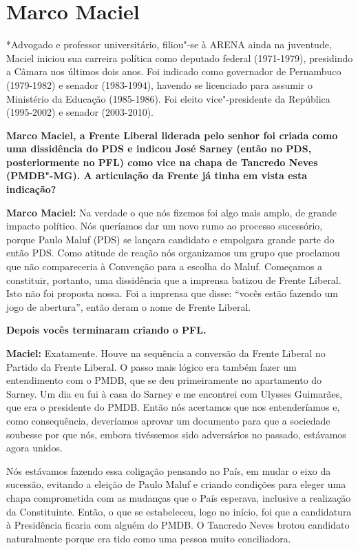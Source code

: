 \section {Marco Maciel}

*Advogado e professor universitário, filiou"-se à ARENA ainda na
juventude, Maciel iniciou sua carreira política como deputado federal
(1971-1979), presidindo a Câmara nos últimos dois anos. Foi indicado
como governador de Pernambuco (1979-1982) e senador (1983-1994), havendo
se licenciado para assumir o Ministério da Educação (1985-1986). Foi
eleito vice"-presidente da República (1995-2002) e senador (2003-2010).

\textbf{Marco Maciel, a Frente Liberal liderada pelo senhor foi criada
como uma dissidência do PDS e indicou José Sarney (então no PDS,
posteriormente no PFL) como vice na chapa de Tancredo Neves (PMDB"-MG). A
articulação da Frente já tinha em vista esta indicação?}

\textbf{Marco Maciel:} Na verdade o que nós fizemos foi algo mais amplo,
de grande impacto político. Nós queríamos dar um novo rumo ao processo
sucessório, porque Paulo Maluf (PDS) se lançara candidato e empolgara
grande parte do então PDS. Como atitude de reação nós organizamos um
grupo que proclamou que não compareceria à Convenção para a escolha do
Maluf. Começamos a constituir, portanto, uma dissidência que a imprensa
batizou de Frente Liberal. Isto não foi proposta nossa. Foi a imprensa
que disse: ``vocês estão fazendo um jogo de abertura'', então deram o
nome de Frente Liberal.

\textbf{Depois vocês terminaram criando o PFL.}

\textbf{Maciel:} Exatamente. Houve na sequência a conversão da Frente
Liberal no Partido da Frente Liberal. O passo mais lógico era também
fazer um entendimento com o PMDB, que se deu primeiramente no
apartamento do Sarney. Um dia eu fui à casa do Sarney e me encontrei com
Ulysses Guimarães, que era o presidente do PMDB. Então nós acertamos que
nos entenderíamos e, como consequência, deveríamos aprovar um documento
para que a sociedade soubesse por que nós, embora tivéssemos sido
adversários no passado, estávamos agora unidos.

Nós estávamos fazendo essa coligação pensando no País, em mudar o eixo
da sucessão, evitando a eleição de Paulo Maluf e criando condições para
eleger uma chapa comprometida com as mudanças que o País esperava,
inclusive a realização da Constituinte. Então, o que se estabeleceu,
logo no início, foi que a candidatura à Presidência ficaria com alguém
do PMDB. O Tancredo Neves brotou candidato naturalmente porque era tido
como uma pessoa muito conciliadora.

